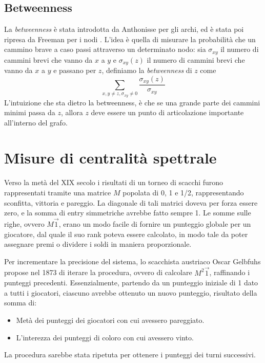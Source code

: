 \subsection{Betweenness}
La \textit{betweenness} è stata introdotta da Anthonisse \cite{ant} per gli archi, ed è stata poi ripresa da Freeman per i nodi \cite{morgan}. L'idea è quella di misurare la probabilità che un cammino brave a caso passi attraverso un determinato nodo: sia $\sigma_{xy}$ il numero di cammini brevi che vanno da $x$ a $y$ e $\sigma_{xy}(z)$ il numero di cammini brevi che vanno da $x$ a $y$ e passano per $z$, definiamo la \textit{betweenness} di $z$ come
\begin{equation}
	\sum_{x, y \neq z, \sigma_{xy} \neq 0}{\frac{\sigma_{xy}(z)}{\sigma_{xy}}}
\end{equation}
L'intuizione che sta dietro la betweenness, è che se una grande parte dei cammini minimi passa da $z$, allora $z$ deve essere un punto di articolazione importante all'interno del grafo.
\section{Misure di centralità spettrale}
Verso la metà del XIX secolo i risultati di un torneo di scacchi furono rappresentati tramite una matrice $M$ popolata di 0, 1 e 1/2, rappresentando sconfitta, vittoria e pareggio. La diagonale di tali matrici doveva per forza essere zero, e la somma di entry simmetriche avrebbe fatto sempre 1. Le somme sulle righe, ovvero $M\vec{1}$, erano un modo facile di fornire un punteggio globale per un giocatore, dal quale il suo rank poteva essere calcolato, in modo tale da poter assegnare premi o dividere i soldi in maniera proporzionale.

Per incrementare la precisione del sistema, lo scacchista austriaco Oscar Gelbfuhs propose nel 1873 di iterare la procedura, ovvero di calcolare $M^2\vec{1}$, raffinando i punteggi precedenti. Essenzialmente, partendo da un punteggio iniziale di 1 dato a tutti i giocatori, ciascuno avrebbe ottenuto un nuovo punteggio, risultato della somma di:
\begin{itemize}
	\item Metà dei punteggi dei giocatori con cui avessero pareggiato.
	\item L'interezza dei punteggi di coloro con cui avessero vinto.
\end{itemize}
La procedura sarebbe stata ripetuta per ottenere i punteggi dei turni successivi.

